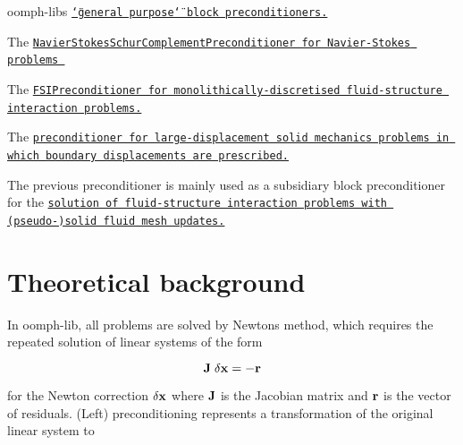 \begin{DoxyItemize}
\item {\ttfamily oomph-\/lib\textquotesingle{}s} \href{../../distributed_general_purpose_block_preconditioners/html/index.html}{\tt \char`\"{}general purpose\char`\"{} block preconditioners.} ~\newline
~\newline

\item The \href{../../../preconditioners/lsc_navier_stokes/html/index.html}{\tt Navier\+Stokes\+Schur\+Complement\+Preconditioner for Navier-\/\+Stokes problems } ~\newline
~\newline

\item The \href{../../../preconditioners/fsi/html/index.html}{\tt F\+S\+I\+Preconditioner for monolithically-\/discretised fluid-\/structure interaction problems.} ~\newline
~\newline

\item The \href{../../../preconditioners/prescribed_displ_lagr_mult/html/index.html}{\tt preconditioner for large-\/displacement solid mechanics problems in which boundary displacements are prescribed.}~\newline
~\newline

\item The previous preconditioner is mainly used as a subsidiary block preconditioner for the \href{../../../preconditioners/pseudo_solid_fsi/html/index.html}{\tt solution of fluid-\/structure interaction problems with (pseudo-\/)solid fluid mesh updates.} ~\newline
~\newline

\end{DoxyItemize}\hypertarget{index_theory}{}\section{Theoretical background}\label{index_theory}
In {\ttfamily oomph-\/lib}, all problems are solved by Newton\textquotesingle{}s method, which requires the repeated solution of linear systems of the form

\[ {\bf J}\;{\bf \delta x}=-{\bf r} \]

for the Newton correction $\bf \delta x$ where ${\bf J}$ is the Jacobian matrix and $\bf r$ is the vector of residuals. (Left) preconditioning represents a transformation of the original linear system to


